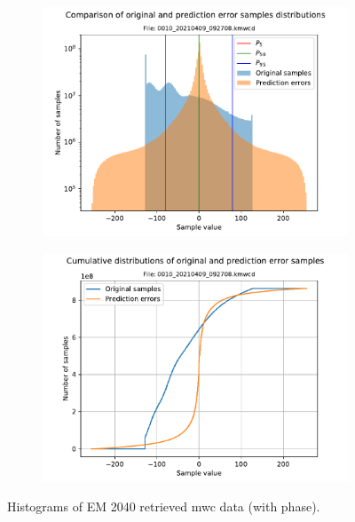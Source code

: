 \begin{figure}[h!]
	\centering
	\begin{subfigure}{0.45\textwidth}
		\centering
		\includegraphics[width=\linewidth]{images/kmall_hists/0010_20210409_092708.kmwcd_hist.pdf}
	\end{subfigure}%
	\begin{subfigure}{0.45\textwidth}
		\centering
		\includegraphics[width=\linewidth]{images/kmall_hists/0010_20210409_092708.kmwcd_hist_cum.pdf}
	\end{subfigure}
	\caption{Histograms of EM 2040 retrieved \acrshort{mwc} data (with phase).}
	\label{fig:0010_kmall}
\end{figure}

